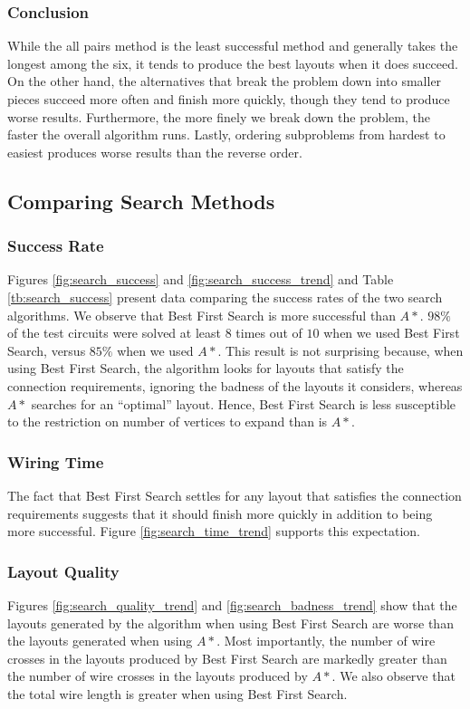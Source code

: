 \subsubsection{Conclusion}
While the all pairs method is the least successful
method and generally takes the longest among the six,
it tends to produce the best layouts when it does succeed. On the other hand,
the alternatives that break the problem down into smaller pieces succeed more
often and finish more quickly, though they tend to produce worse results.
Furthermore,
the more finely we break down the problem, the faster the overall algorithm runs.
Lastly, ordering subproblems from hardest to easiest produces worse results than
the reverse order.

\subsection{Comparing Search Methods}

\subsubsection{Success Rate}
Figures \ref{fig:search_success} and
\ref{fig:search_success_trend} and Table \ref{tb:search_success} present
data comparing the success rates of the two search algorithms.
We observe that Best First Search is more
successful than $A*$. $98\%$ of the test circuits were solved at least $8$ times
out of $10$ when we used Best First Search, versus $85\%$ when we used $A*$.
This result is not surprising because, when using Best First Search,
the algorithm
looks for layouts that satisfy the connection requirements, ignoring the badness
of the layouts it considers, whereas $A*$ searches for an ``optimal'' layout.
Hence, Best First Search is less susceptible to the
restriction on number of vertices to expand than is $A*$.

\subsubsection{Wiring Time}
The fact that Best First Search settles for any layout that satisfies the
connection
requirements suggests that it should finish more quickly in addition to being
more successful. Figure \ref{fig:search_time_trend} supports this
expectation.

\subsubsection{Layout Quality}
Figures \ref{fig:search_quality_trend} and \ref{fig:search_badness_trend} show
that the layouts generated by the
algorithm when using Best First Search are worse than the layouts generated
when using $A*$. Most importantly, the
number of wire crosses in the layouts produced by Best First Search are markedly
greater than the number of wire crosses in the layouts produced by $A*$. We also
observe that the total wire length is greater when using Best First Search.

